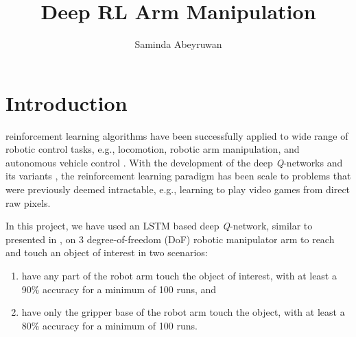 \documentclass[10pt,journal,compsoc]{IEEEtran}
\begin{document}
\title{Deep RL Arm Manipulation}

\author{Saminda Abeyruwan}

%
{}


\maketitle
\IEEEdisplaynontitleabstractindextext
\IEEEpeerreviewmaketitle
\section{Introduction}
\label{sec:introduction}

 reinforcement learning algorithms have been successfully applied to wide range of robotic control tasks, e.g., locomotion, robotic arm manipulation, and autonomous vehicle control \cite{GuHolLilLev17}. With the development of the deep \textit{Q}-networks and its variants  \cite{mnih2015humanlevel} \cite{Mnih:2016:AMD:3045390.3045594} \cite{Arulkumaran2017ABS}, the reinforcement learning paradigm has been scale to problems that were previously deemed intractable, e.g., learning to play video games from direct raw pixels.  

In this project, we have used an LSTM based deep \textit{Q}-network, similar to presented in \cite{DBLP:conf/aaaifs/HausknechtS15}, on 3 degree-of-freedom (DoF) robotic manipulator arm to reach and touch an object of interest in two scenarios:

\begin{enumerate}
\item have any part of the robot arm touch the object of interest, with at least a 90\% accuracy for a minimum of 100 runs, and
\item have only the gripper base of the robot arm touch the object, with at least a 80\% accuracy for a minimum of 100 runs.
\end{enumerate} 
\end{document}
